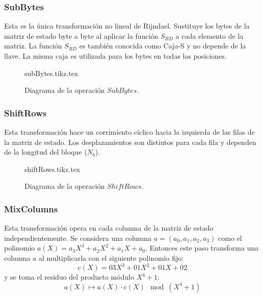 \subsubsection{SubBytes}

Esta es la única transformación no lineal de Rijndael. Sustituye
los bytes de la matriz de estado byte a byte al aplicar la función
$S_{RD}$ a cada elemento de la matriz. La función $S_{RD}$ es también
conocida como Caja-S y no depende de la llave. La misma caja es utilizada
para los bytes en todas las posiciones.

\begin{figure}
  \begin{center}
    {subBytes.tikz.tex}
    \caption{Diagrama de la operación $SubBytes$.}
   \end{center}
\end{figure}


\subsubsection{ShiftRows}

Esta transformación hace un corrimiento cíclico hacia la izquierda de las
filas de la matriz de estado. Los desplazamientos son distintos para cada
fila y dependen de la longitud del bloque ($N_b$).

\begin{figure}
  \begin{center}
    {shiftRows.tikz.tex}
    \caption{Diagrama de la operación $ShiftRows$.}
   \end{center}
\end{figure}


\subsubsection{MixColumns}

Esta transformación opera en cada columna de la matriz de estado
independientemente. Se considera una columna $a = (a_0, a_1, a_2, a_3)$
como el polinomio $a(X) = a_3X^3 + a_2X^2 + a_1X + a_0$.
Entonces este paso transforma una columna $a$ al multiplicarla con el
siguiente polinomio fijo:
\begin{equation}
  \label{cifrado_aes_poli}
  c(X) = 03X^3 + 01X^2 + 01X+ 02
\end{equation}
y se toma el residuo del producto módulo $X^4+1$:
\begin{equation}
  \label{cifrado_aes_mix}
  a(X) \mapsto a(X) \cdotp c(X) \mod (X^4+1)
\end{equation}

